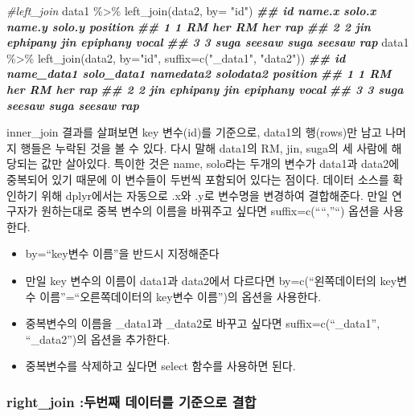 \documentclass[
]{book}
\newenvironment{Shaded}{\begin{snugshade}}{\end{snugshade}}
\newcommand{\AttributeTok}[1]{\textcolor[rgb]{0.77,0.63,0.00}{#1}}
\newcommand{\CommentTok}[1]{\textcolor[rgb]{0.56,0.35,0.01}{\textit{#1}}}
\newcommand{\DocumentationTok}[1]{\textcolor[rgb]{0.56,0.35,0.01}{\textbf{\textit{#1}}}}
\newcommand{\FunctionTok}[1]{\textcolor[rgb]{0.00,0.00,0.00}{#1}}
\newcommand{\NormalTok}[1]{#1}
\newcommand{\SpecialCharTok}[1]{\textcolor[rgb]{0.00,0.00,0.00}{#1}}
\newcommand{\StringTok}[1]{\textcolor[rgb]{0.31,0.60,0.02}{#1}}
\providecommand{\tightlist}{%
  \setlength{\itemsep}{0pt}\setlength{\parskip}{0pt}}
\theoremstyle{definition}
\theoremstyle{definition}
\theoremstyle{definition}
\theoremstyle{definition}
\theoremstyle{remark}
\begin{document}
\begin{Shaded}
\begin{Highlighting}[]
\CommentTok{\#left\_join}
\NormalTok{data1 }\SpecialCharTok{\%\textgreater{}\%} 
  \FunctionTok{left\_join}\NormalTok{(data2, }\AttributeTok{by=} \StringTok{"id"}\NormalTok{)}
\DocumentationTok{\#\#   id name.x   solo.x name.y   solo.y position}
\DocumentationTok{\#\# 1  1     RM      her     RM      her      rap}
\DocumentationTok{\#\# 2  2    jin ephipany    jin epiphany    vocal}
\DocumentationTok{\#\# 3  3   suga   seesaw   suga   seesaw      rap}
\NormalTok{data1 }\SpecialCharTok{\%\textgreater{}\%} 
  \FunctionTok{left\_join}\NormalTok{(data2, }\AttributeTok{by=}\StringTok{"id"}\NormalTok{, }\AttributeTok{suffix=}\FunctionTok{c}\NormalTok{(}\StringTok{"\_data1"}\NormalTok{, }\StringTok{"data2"}\NormalTok{))}
\DocumentationTok{\#\#   id name\_data1 solo\_data1 namedata2 solodata2 position}
\DocumentationTok{\#\# 1  1         RM        her        RM       her      rap}
\DocumentationTok{\#\# 2  2        jin   ephipany       jin  epiphany    vocal}
\DocumentationTok{\#\# 3  3       suga     seesaw      suga    seesaw      rap}
\end{Highlighting}
\end{Shaded}

inner\_join 결과를 살펴보면 key 변수(id)를 기준으로, data1의 행(rows)만 남고 나머지 행들은 누락된 것을 볼 수 있다. 다시 말해 data1의 RM, jin, suga의 세 사람에 해당되는 값만 살아있다. 특이한 것은 name, solo라는 두개의 변수가 data1과 data2에 중복되어 있기 때문에 이 변수들이 두번씩 포함되어 있다는 점이다. 데이터 소스를 확인하기 위해 dplyr에서는 자동으로 .x와 .y로 변수명을 변경하여 결합해준다. 만일 연구자가 원하는대로 중복 변수의 이름을 바꿔주고 싶다면 suffix=c(````,''``) 옵션을 사용한다.

\begin{itemize}
\tightlist
\item
  by=``key변수 이름''을 반드시 지정해준다
\item
  만일 key 변수의 이름이 data1과 data2에서 다르다면 by=c(``왼쪽데이터의 key변수 이름''=``오른쪽데이터의 key변수 이름'')의 옵션을 사용한다.
\item
  중복변수의 이름을 \_data1과 \_data2로 바꾸고 싶다면 suffix=c(``\_data1'', ``\_data2'')의 옵션을 추가한다.
\item
  중복변수를 삭제하고 싶다면 select 함수를 사용하면 된다.
\end{itemize}

\hypertarget{right_join-uxb450uxbc88uxc9f8-uxb370uxc774uxd130uxb97c-uxae30uxc900uxc73cuxb85c-uxacb0uxd569}{%
\subsubsection{right\_join :두번째 데이터를 기준으로 결합}\label{right_join-uxb450uxbc88uxc9f8-uxb370uxc774uxd130uxb97c-uxae30uxc900uxc73cuxb85c-uxacb0uxd569}}
\end{document}
